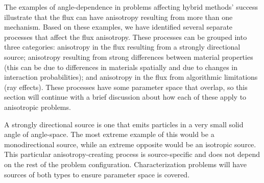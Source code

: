 The examples of angle-dependence in problems affecting hybrid methods' success
illustrate that the flux can have anisotropy resulting from more than one
mechanism. Based on these examples, we have identified several separate
processes that affect the flux anisotropy. These processes can be grouped into
three categories: anisotropy in the flux resulting from a strongly
directional source; anisotropy resulting from strong differences between
material properties (this can be due to differences in
materials spatially and due to changes in interaction probabilities);
and anisotropy in the flux from algorithmic limitations (ray effects).
These processes have some parameter
space that overlap, so this section will continue with a brief discussion about how each
of these apply to anisotropic problems.

A strongly directional source is one that emits particles in a very small solid
angle of angle-space. The most extreme example of this would be a
monodirectional source, while an extreme opposite would be an isotropic source.
This particular anisotropy-creating process
is source-specific and does not depend on the rest of the
problem configuration. Characterization problems will have sources of both types
to ensure parameter space is covered.

